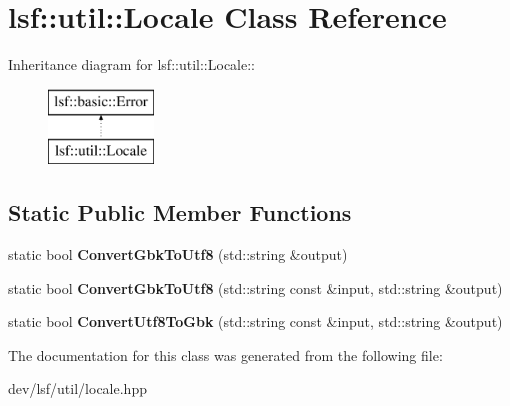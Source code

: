 \hypertarget{classlsf_1_1util_1_1Locale}{
\section{lsf::util::Locale Class Reference}
\label{classlsf_1_1util_1_1Locale}
}
Inheritance diagram for lsf::util::Locale::\begin{figure}[H]
\begin{center}
\leavevmode
\includegraphics[height=2cm]{classlsf_1_1util_1_1Locale}
\end{center}
\end{figure}
\subsection*{Static Public Member Functions}
\begin{DoxyCompactItemize}
\item 
\hypertarget{classlsf_1_1util_1_1Locale_a1287bb29bd67179e7a57cb706c518c4e}{
static bool {\bfseries ConvertGbkToUtf8} (std::string \&output)}
\label{classlsf_1_1util_1_1Locale_a1287bb29bd67179e7a57cb706c518c4e}

\item 
\hypertarget{classlsf_1_1util_1_1Locale_a8cbb55470e94d63f69de69ae2d454ab6}{
static bool {\bfseries ConvertGbkToUtf8} (std::string const \&input, std::string \&output)}
\label{classlsf_1_1util_1_1Locale_a8cbb55470e94d63f69de69ae2d454ab6}

\item 
\hypertarget{classlsf_1_1util_1_1Locale_aa7fd42a2fd046c3519157ce29d34e925}{
static bool {\bfseries ConvertUtf8ToGbk} (std::string const \&input, std::string \&output)}
\label{classlsf_1_1util_1_1Locale_aa7fd42a2fd046c3519157ce29d34e925}

\end{DoxyCompactItemize}


The documentation for this class was generated from the following file:\begin{DoxyCompactItemize}
\item 
dev/lsf/util/locale.hpp\end{DoxyCompactItemize}
